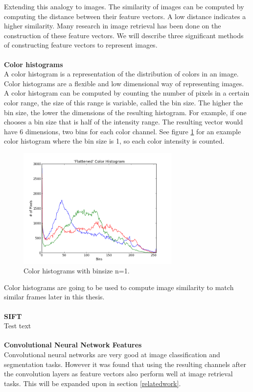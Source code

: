 \documentclass{article}
\begin{document}
Extending this analogy to images. The similarity of images can be computed by computing the distance between their feature vectors. A low distance indicates a higher similarity. Many research in image retrieval has been done on the construction of these feature vectors. We will describe three significant methods of constructing feature vectors to represent images.
\\\\
\textbf{Color histograms}\\
A color histogram is a representation of the distribution of colors in an image. Color histograms are a flexible and low dimensional way of representing images. A color histogram can be computed by counting the number of pixels in a certain color range, the size of this range is variable, called the bin size. The higher the bin size, the lower the dimensions of the resulting histogram. For example, if one chooses a bin size that is half of the intensity range. The resulting vector would have 6 dimensions, two bins for each color channel. See figure \ref{fig:colorhistogram} for an example color histogram where the bin size is 1, so each color intensity is counted. 

\begin{figure}[H]
	\includegraphics[width=8cm]{images/colorhistogram.png}
	\centering
	\caption{Color histograms with binsize n=1.}
	\label{fig:colorhistogram}
\end{figure}
Color histograms are going to be used to compute image similarity to match similar frames later in this thesis.
\\ \\
\textbf{SIFT}\\
Test text
\\ \\
\textbf{Convolutional Neural Network Features} \\
Convolutional neural networks are very good at image classification and segmentation tasks. However it was found that using the resulting channels after the convolution layers as feature vectors also perform well at image retrieval tasks. This will be expanded upon in section \ref{relatedwork}.
\end{document}
